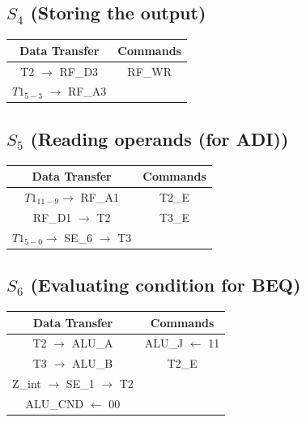 \documentclass[]{report}
\begin{document}
        \subsection*{$S_4$ (Storing the output)}
        \begin{center}
            \begin{tabular}{|c|c|}
                \hline
                Data Transfer & Commands \\
                \hline
                T2 $\to$ RF\_D3 & RF\_WR\\
                $T1_{5-3}$ $\to$ RF\_A3 & \\                
                \hline
            \end{tabular}
        \end{center}
        \subsection*{$S_5$ (Reading operands (for ADI))}
        \begin{center}
            \begin{tabular}{|c|c|}
                \hline
                Data Transfer & Commands \\
                \hline
                $T1_{11-9} \to$ RF\_A1  & T2\_E\\
                RF\_D1 $\to$ T2 & T3\_E\\
                $T1_{5-0} \to$ SE\_6 $\to$ T3 & \\
                \hline
            \end{tabular}
        \end{center}

        \subsection*{$S_6$ (Evaluating condition for BEQ)} %
        \begin{center}
            \begin{tabular}{|c|c|}
                \hline
                Data Transfer & Commands \\
                \hline
                T2 $\to$ ALU\_A & ALU\_J $\leftarrow$ 11\\
                T3 $\to$ ALU\_B & T2\_E\\
                Z\_int $\to$ SE\_1 $\to$ T2 & \\
                ALU\_CND $\leftarrow$ 00 & \\
                \hline
            \end{tabular}
        \end{center}
\end{document}
